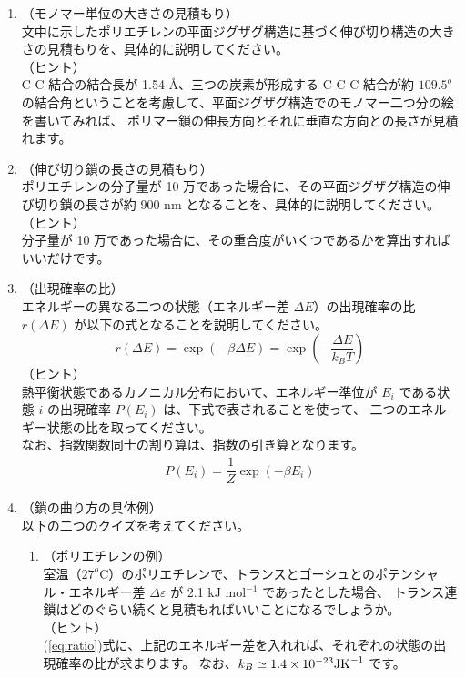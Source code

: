 \documentclass[uplatex,dvipdfmx,a4paper,11pt, titlepage]{jsarticle}
\begin{document}
	\begin{enumerate}
		\item
		\label{it:2-1}
		（モノマー単位の大きさの見積もり）\\
		文中に示したポリエチレンの平面ジグザグ構造に基づく伸び切り構造の大きさの見積もりを、具体的に説明してください。\\
		（ヒント）\\
		C-C 結合の結合長が 1.54 \AA、三つの炭素が形成する C-C-C 結合が約 $109.5^o$ の結合角ということを考慮して、平面ジグザグ構造でのモノマー二つ分の絵を書いてみれば、
		ポリマー鎖の伸長方向とそれに垂直な方向との長さが見積れます。

		\item
		\label{it:2-2}
		（伸び切り鎖の長さの見積もり）\\
		ポリエチレンの分子量が 10 万であった場合に、その平面ジグザグ構造の伸び切り鎖の長さが約 900 nm となることを、具体的に説明してください。\\
		（ヒント）\\
		分子量が 10 万であった場合に、その重合度がいくつであるかを算出すればいいだけです。

		\item
		\label{it:2-3}
		（出現確率の比）\\
		エネルギーの異なる二つの状態（エネルギー差 $\Delta E$）の出現確率の比 $r(\Delta E)$ が以下の式となることを説明してください。
		\begin{equation*}
		r(\Delta E) = \exp(-\beta \Delta E)=\exp \left( -\dfrac{\Delta E}{k_B T} \right)
		\end{equation*}
		（ヒント）\\
		熱平衡状態であるカノニカル分布において、エネルギー準位が $E_i$ である状態 $i$ の出現確率 $P(E_i)$ は、下式で表されることを使って、
		二つのエネルギー状態の比を取ってください。\\
		なお、指数関数同士の割り算は、指数の引き算となります。
		\begin{align*}
		P(E_i) = \dfrac{1}{Z} \exp(-\beta E_i)
		\end{align*}

		\item
		（鎖の曲り方の具体例）\\
		以下の二つのクイズを考えてください。

		\begin{enumerate}
			\item
			\label{it:2-4}
			（ポリエチレンの例）\\
			室温（$27^o$C）のポリエチレンで、トランスとゴーシュとのポテンシャル・エネルギー差 $\Delta \varepsilon$ が 2.1 kJ mol$^{-1}$ であったとした場合、
			トランス連鎖はどのぐらい続くと見積もればいいことになるでしょうか。\\
			（ヒント）\\
			(\ref{eq:ratio})式に、上記のエネルギー差を入れれば、それぞれの状態の出現確率の比が求まります。
			なお、$k_B \simeq 1.4 \times 10^{-23} {\rm J K}^{-1}$ です。 


\end{enumerate}
\end{enumerate}
\end{document}
